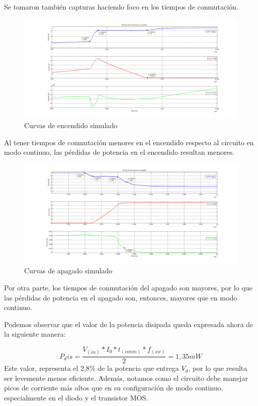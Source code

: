 \documentclass[e4_tp1_main.tex]{subfiles}
\begin{document}
Se tomaron también capturas haciendo foco en los tiempos de conmutación.

\begin{figure}[H]
\centering
\includegraphics[width=1\linewidth]{Imagenes/Punto4/tiempos_encendidoX.png}
\caption{Curvas de encendido simulado}
\end{figure}

Al tener tiempos de conmutación menores en el encendido respecto al circuito en modo continuo, las pérdidas de potencia en el encendido resultan menores.

\begin{figure}[H]
\centering
\includegraphics[width=1\linewidth]{Imagenes/Punto4/tiempos_apagadoX.png}
\caption{Curvas de apagado simulado}
\end{figure}

Por otra parte, los tiempos de conmutación del apagado son mayores, por lo que las pérdidas de potencia en el apagado son, entonces, mayores que en modo continuo.\par
Podemos observar que el valor de la potencia disipada queda expresada ahora de la siguiente manera:\par
\[ P_dis = \frac{V_(in)*I_0*t_(conm)*f_(sw)}{2} = 1,35 mW  \] 
Este valor, representa el 2,8\% de la potencia que entrega $V_d$, por lo que resulta ser levemente menos eficiente. Además, notamos como el circuito debe manejar picos de corriente más altos que en su configuración de modo continuo, especialmente en el diodo y el transistor MOS.

\newpage
\end{document}
